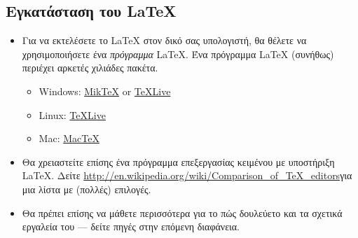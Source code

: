 \documentclass{beamer}
\begin{document}
\subsection{Εγκατάσταση του \LaTeX{}}
\begin{frame}{\insertsubsection}
\begin{itemize}
\item Για να εκτελέσετε το \LaTeX{} στον δικό σας υπολογιστή, θα θέλετε να χρησιμοποιήσετε ένα \emph{πρόγραμμα} \LaTeX{}. Ένα πρόγραμμα \LaTeX{} (συνήθως) περιέχει αρκετές χιλιάδες πακέτα.
\en
\begin{itemize}
\item  Windows: \href{http://miktex.org/}{Mik\TeX} or \href{http://tug.org/texlive/}{\TeX Live}
\item  Linux: \href{http://tug.org/texlive/}{\TeX Live}
\item  Mac: \href{http://tug.org/mactex/}{Mac\TeX}
\end{itemize}
\gr
\item Θα χρειαστείτε επίσης ένα πρόγραμμα επεξεργασίας κειμένου με υποστήριξη \LaTeX{}. Δείτε \en \url{http://en.wikipedia.org/wiki/Comparison_of_TeX_editors}\gr για μια λίστα με (πολλές) επιλογές.
\item Θα πρέπει επίσης να μάθετε περισσότερα για το πώς δουλεύετο \en {} \gr και τα σχετικά εργαλεία του --- δείτε πηγές στην επόμενη διαφάνεια.
\end{itemize}
\end{frame}

\end{document}
